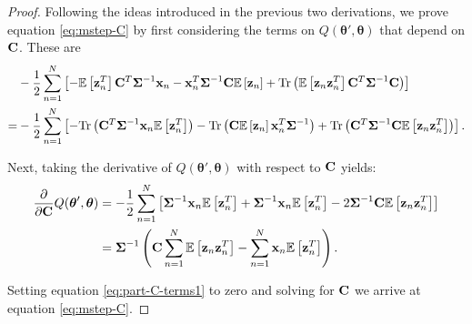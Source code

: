 \documentclass[11pt]{article}
\numberwithin{equation}{section}
\newcommand{\expectation}[1]{\mathbb{E}\left[#1\right]}
\newcommand{\Tr}[1]{\text{Tr}\left(#1\right)}
\newcommand{\x}{{\bf x}}
\newcommand{\z}{{\bf z}}
\begin{document}
\begin{proof}
	Following the ideas introduced in the previous two derivations, we prove equation \ref{eq:mstep-C} by first considering the terms on $Q(\boldsymbol\theta', \boldsymbol\theta)$ that depend on $\bf C$. These are
	\begin{align}
		& -\frac{1}{2}\sum_{n=1}^N \left[ -\expectation{\z_n^T} {\bf C}^T \boldsymbol{\Sigma}^{-1}\x_n - \x_n^T \boldsymbol{\Sigma}^{-1} {\bf C} \expectation{\z_n} + \text{Tr}\left(\expectation{\z_n\z_n^T}{\bf C}^T\boldsymbol\Sigma^{-1}{\bf C}\right)\right]\\
		=& -\frac{1}{2}\sum_{n=1}^N \left[ -\Tr{{\bf C}^T\boldsymbol{\Sigma}^{-1}\x_n \expectation{\z_n^T}} - \Tr{{\bf C}\expectation{\z_n}\x_n^T\boldsymbol{\Sigma}^{-1}} +  \Tr{{\bf C}^T\boldsymbol{\Sigma}^{-1}{\bf C}\expectation{\z_n\z_n^T}} \right].
	\end{align}
	
	Next, taking the derivative of $Q(\boldsymbol{\theta}', \boldsymbol{\theta})$ with respect to $\bf C$ yields:
	\begin{align}
		\frac{\partial}{\partial {\bf C}} Q(\boldsymbol{\theta}', \boldsymbol{\theta}) &= -\frac{1}{2}\sum_{n=1}^N \left[ \boldsymbol{\Sigma}^{-1} \x_n \expectation{\z_n^T} + \boldsymbol{\Sigma}^{-1}\x_n\expectation{\z_n^T} - 2 \boldsymbol{\Sigma}^{-1}{\bf C}\expectation{\z_n\z_n^T} \right] \\
		&= \boldsymbol{\Sigma}^{-1} \left( {\bf C} \sum_{n=1}^N \expectation{\z_n\z_n^T} - \sum_{n=1}^N\x_n\expectation{\z_n^T} \right). \label{eq:part-C-terms1}
	\end{align}
	
	Setting equation \eqref{eq:part-C-terms1} to zero and solving for $\bf C$ we arrive at equation \eqref{eq:mstep-C}.
\end{proof}
\end{document}
